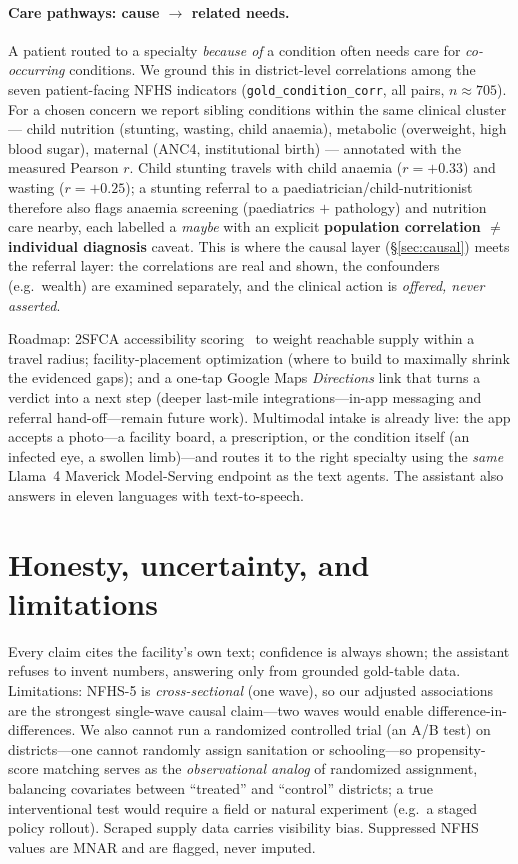 \documentclass[11pt]{article}
\begin{document}
\paragraph{Care pathways: cause $\to$ related needs.} A patient routed to a specialty \emph{because of} a condition often needs care for \emph{co-occurring} conditions. We ground this in district-level correlations among the seven patient-facing NFHS indicators (\texttt{gold\_condition\_corr}, all pairs, $n\approx 705$). For a chosen concern we report sibling conditions within the same clinical cluster --- child nutrition (stunting, wasting, child anaemia), metabolic (overweight, high blood sugar), maternal (ANC4, institutional birth) --- annotated with the measured Pearson $r$. Child stunting travels with child anaemia ($r=+0.33$) and wasting ($r=+0.25$); a stunting referral to a paediatrician/child-nutritionist therefore also flags anaemia screening (paediatrics $+$ pathology) and nutrition care nearby, each labelled a \emph{maybe} with an explicit \textbf{population correlation $\neq$ individual diagnosis} caveat. This is where the causal layer (\S\ref{sec:causal}) meets the referral layer: the correlations are real and shown, the confounders (e.g.\ wealth) are examined separately, and the clinical action is \emph{offered, never asserted}.

Roadmap: 2SFCA accessibility scoring~\cite{luo2003} to weight reachable supply within a travel radius; facility-placement optimization (where to build to maximally shrink the evidenced gaps); and a one-tap Google Maps \emph{Directions} link that turns a verdict into a next step (deeper last-mile integrations---in-app messaging and referral hand-off---remain future work). Multimodal intake is already live: the app accepts a photo---a facility board, a prescription, or the condition itself (an infected eye, a swollen limb)---and routes it to the right specialty using the \emph{same} Llama~4 Maverick Model-Serving endpoint as the text agents. The assistant also answers in eleven languages with text-to-speech.

\section{Honesty, uncertainty, and limitations}
Every claim cites the facility's own text; confidence is always shown; the assistant refuses to invent numbers, answering only from grounded gold-table data. Limitations: NFHS-5 is \emph{cross-sectional} (one wave), so our adjusted associations are the strongest single-wave causal claim---two waves would enable difference-in-differences. We also cannot run a randomized controlled trial (an A/B test) on districts---one cannot randomly assign sanitation or schooling---so propensity-score matching serves as the \emph{observational analog} of randomized assignment, balancing covariates between ``treated'' and ``control'' districts; a true interventional test would require a field or natural experiment (e.g.\ a staged policy rollout). Scraped supply data carries visibility bias. Suppressed NFHS values are MNAR and are flagged, never imputed.
\end{document}
